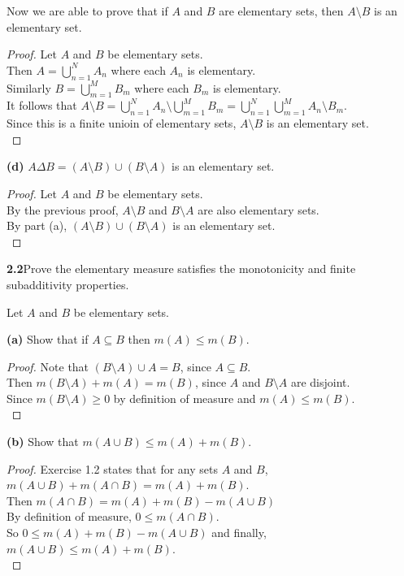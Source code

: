 \documentclass[12pt]{article}
\begin{document}
	Now we are able to prove that if $A$ and $B$ are elementary sets, then $A \setminus B$ is an elementary set. \\
	
	\begin{proof}
		Let $A$ and $B$ be elementary sets. \\
		Then $A = \bigcup\limits_{n=1}^{N} A_{n}$ where each $A_{n}$ is elementary. \\
		Similarly $B = \bigcup\limits_{m=1}^{M} B_{m}$ where each $B_{m}$ is elementary. \\
		It follows that $A \setminus B = \bigcup\limits_{n=1}^{N} A_{n} \setminus \bigcup\limits_{m=1}^{M} B_{m} = \bigcup\limits_{n=1}^{N}  \bigcup\limits_{m=1}^{M} A_{n} \setminus B_{m}$. \\
		Since this is a finite unioin of elementary sets, $A \setminus B$ is an elementary set. \\
	\end{proof}

\hspace{-4 ex}\textbf{(d)} $A \Delta B = (A \setminus B) \cup (B \setminus A)$ is an elementary set.
\begin{proof}
	Let $A$ and $B$ be elementary sets. \\
	By the previous proof, $A \setminus B$ and $B \setminus A$ are also elementary sets. \\
	By part (a), $(A \setminus B) \cup (B \setminus A)$ is an elementary set.\\
\end{proof}



\hspace{-4 ex}\textbf{2.2}Prove the elementary measure satisfies the monotonicity and finite subadditivity properties. \bigbreak

Let $A$ and $B$ be elementary sets. \bigbreak

\hspace{-4 ex}\textbf{(a)} Show that if $A \subseteq B$ then $m(A) \leq m(B)$. \bigbreak

\begin{proof}
	Note that $(B \setminus A) \cup A = B$, since $A \subseteq B$. \\
	Then $m(B \setminus A) + m(A) = m(B)$, since $A$ and $B \setminus A$ are disjoint. \\
	Since $m(B\setminus A) \geq 0$ by definition of measure and $m(A) \leq m(B)$.\\	
\end{proof}

\hspace{-4 ex}\textbf{(b)} Show that $m(A \cup B) \leq m(A) + m(B)$. \bigbreak

\begin{proof}
	Exercise 1.2 states that for any sets $A$ and $B$, \\ $m(A\cup B)+m(A\cap B)=m(A)+m(B)$. \\
	Then $m(A\cap B) = m(A) + m(B) - m(A\cup B)$ \\
	By definition of measure, $0 \leq m(A \cap B)$. \\
	So $0 \leq m(A) + m(B) - m(A\cup B)$ and finally, $m(A\cup B) \leq m(A)+m(B)$. \\
\end{proof}
\end{document}
